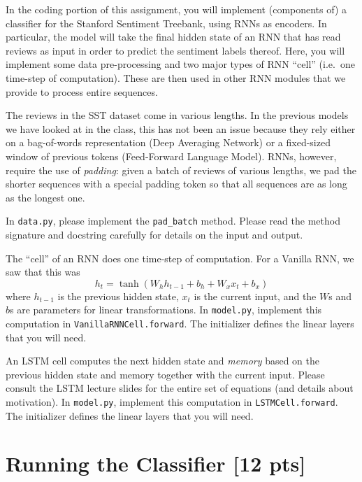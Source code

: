 \documentclass[11pt]{article}
\begin{document}
In the coding portion of this assignment, you will implement (components of) a classifier for the Stanford Sentiment Treebank, using RNNs as encoders.  In particular, the model will take the final hidden state of an RNN that has read reviews as input in order to predict the sentiment labels thereof.  Here, you will implement some data pre-processing and two major types of RNN ``cell'' (i.e.\ one time-step of computation).  These are then used in other RNN modules that we provide to process entire sequences.

\vspace{2em}
 The reviews in the SST dataset come in various lengths.  In the previous models we have looked at in the class, this has not been an issue because they rely either on a bag-of-words representation (Deep Averaging Network) or a fixed-sized window of previous tokens (Feed-Forward Language Model).  RNNs, however, require the use of \emph{padding}: given a batch of reviews of various lengths, we pad the shorter sequences with a special padding token so that all sequences are as long as the longest one.

In \texttt{data.py}, please implement the \texttt{pad\_batch} method.  Please read the method signature and docstring carefully for details on the input and output. 

\vspace{2em}
 The ``cell'' of an RNN does one time-step of computation.  For a Vanilla RNN, we saw that this was
\[ h_t = \tanh\left( W_h h_{t-1} + b_h + W_x x_t + b_x \right) \]
where $h_{t-1}$ is the previous hidden state, $x_t$ is the current input, and the $W$s and $b$s are parameters for linear transformations. In \texttt{model.py}, implement this computation in \texttt{VanillaRNNCell.forward}.  The initializer defines the linear layers that you will need.

\vspace{2em}
 An LSTM cell computes the next hidden state and \emph{memory} based on the previous hidden state and memory together with the current input.  Please consult the LSTM lecture slides for the entire set of equations (and details about motivation). In \texttt{model.py}, implement this computation in \texttt{LSTMCell.forward}. The initializer defines the linear layers that you will need.


\section{Running the Classifier [12 pts]}
\end{document}

